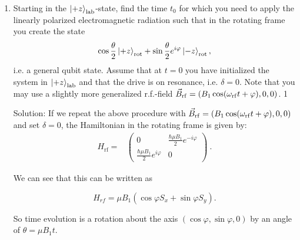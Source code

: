 \documentclass{../lab}
\begin{document}
\begin{enumerate}
\begin{enumerate}
			

		
		\item Starting in the $\ket{+z}_{\rm lab}$-state, find the time $t_{0}$ for which you need to apply the linearly polarized electromagnetic radiation such that in the rotating frame 
			you create the state\begin{equation} \label{eq:bloch}
			\cos\frac{\theta}{2}\ket{+z}_{\rm rot}+\sin\frac{\theta}{2}e^{i\varphi}\ket{-z}_{\rm rot},\nonumber
			\end{equation} i.e. 
			a general qubit state. Assume that  at $t=0$ you have initialized the system in $\ket{+z}_{\rm lab}$ and that the drive is on resonance, i.e. $\delta=0$. Note that you may use a slightly more generalized r.f.-field $\vec{B}_{\rm rf}=
			(B_1\cos (\omega_{\rm rf} t+ \varphi),0 , 0)$.  
			{1}
			
			Solution: If we repeat the above procedure with $\vec{B}_{\rm rf}=
			(B_1\cos (\omega_{\rm rf} t+ \varphi),0 , 0)$ and set $\delta = 0$, the Hamiltonian in the rotating frame is given by:
\begin{align*}
	H_\text{rf} =& 
	\begin{pmatrix}
		0 & \frac{\hbar\mu B_1}{2} e^{-i\varphi}\\
		\frac{\hbar\mu B_1}{2} e^{i\varphi} & 0
	\end{pmatrix}~.
\end{align*}

We can see that this can be written as

$$H_{rf}=\mu B_1 (\cos \varphi S_x +\sin \varphi S_y).$$

So time evolution is a rotation about the axis $(\cos\varphi,\sin\varphi,0)$ by an angle of $\theta=\mu B_1 t$.


\end{enumerate}
\end{enumerate}
\end{document}
